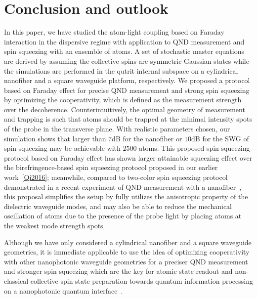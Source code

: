 \documentclass[preprint,aps,pra,onecolumn,superscriptaddress]{revtex4-1} %
\begin{document}
\section{Conclusion and outlook}
In this paper, we have studied the atom-light coupling based on Faraday interaction in the dispersive regime with application to QND measurement and spin squeezing with an ensemble of atoms. A set of stochastic master equations are derived by assuming the collective spins are symmetric Gaussian states while the simulations are performed in the qutrit internal subspace on a cylindrical nanofiber and a square waveguide platform, respectively. We proposed a protocol based on Faraday effect for precise QND measurement and strong spin squeezing by optimizing the cooperativity, which is defined as the measurement strength over the decoherence. Counterintuitively, the optimal geometry of measurement and trapping is such that atoms should be trapped at the minimal intensity spots of the probe in the transverse plane. With realistic parameters chosen, our simulation shows that larger than $ 7 $dB for the nanofiber or $ 10 $dB for the SWG of spin squeezing may be achievable with $ 2500 $ atoms. This proposed spin squeezing protocol based on Faraday effect has shown larger attainable squeezing effect over the birefringence-based spin squeezing protocol proposed in our earlier work~\ref{Qi2016}; meanwhile, compared to two-color spin squeezing protocol demonstrated in a recent experiment of QND measurement with a nanofiber~\cite{Beguin2017Observation}, this proposal simplifies the setup by fully utilizes the anisotropic property of the dielectric waveguide modes, and may also be able to reduce the mechanical oscillation of atoms due to the presence of the probe light by placing atoms at the weakest mode strength spots. 

Although we have only considered a cylindrical nanofiber and a square waveguide geometries, it is immediate applicable to use the idea of optimizing cooperativity with other nanophotonic waveguide geometries for a preciser QND measurement and stronger spin squeezing which are the key for atomic state readout and non-classical collective spin state preparation towards quantum information processing on a nanophotonic quantum interface~\cite{Qi2016}. 
\end{document}
